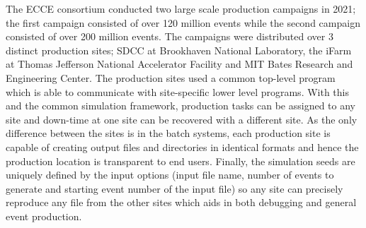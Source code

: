 	The ECCE consortium conducted two large scale production campaigns in 2021; the first campaign consisted of over 120 million events while the second campaign consisted of over 200 million events. The campaigns were distributed over 3 distinct production sites; SDCC at Brookhaven National Laboratory, the iFarm at Thomas Jefferson National Accelerator Facility and MIT Bates Research and Engineering Center. The production sites used a common top-level program which is able to communicate with site-specific lower level programs. With this and the common simulation framework, production tasks can be assigned to any site and down-time at one site can be recovered with a different site. As the only difference between the sites is in the batch systems, each production site is capable of creating output files and directories in identical formats and hence the production location is transparent to end users. Finally, the simulation seeds are uniquely defined by the input options (input file name, number of events to generate and starting event number of the input file) so any site can precisely reproduce any file from the other sites which aids in both debugging and general event production.

